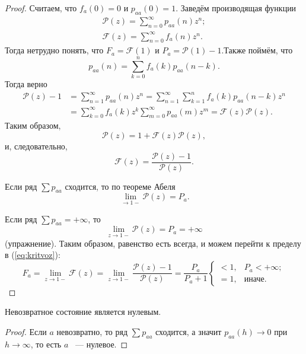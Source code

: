  \begin{proof}
     Считаем, что $f_a(0) = 0 $ и $p_{aa}(0) = 1$. Заведём производящая функции
     \begin{gather*}
         \mathcal{P}(z) = \sum \limits_{n = 0}^{\infty} p_{aa}(n)z^n; \\
     \mathcal{F}(z) =
         \sum \limits_{n = 0}^{\infty} f_a(n)z^n.
     \end{gather*}
     Тогда нетрудно понять, что $F_a = \mathcal{F}(1)$ и $P_a = \mathcal{P}(1) - 1$.Также поймём, что 
     $$p_{aa}(n) = \sum\limits_{k = 0}^{n} f_a(k)p_{aa}(n - k) .$$
    Тогда верно
    \begin{align*}
        \mathcal{P}(z) - 1 &= \sum\limits_{n = 1}^\infty p_{aa}(n)z^n = \sum\limits_{n = 1}^\infty\sum\limits_{k = 1}^n f_a(k)p_{aa}(n - k)z^n \\&=
         \sum\limits_{k = 0}^\infty f_a(k)z^k\sum\limits_{m = 0}^\infty p_{aa}(m)z^m = \mathcal{F}(z)\mathcal{P}(z).
    \end{align*}
     Таким образом,
     $$\mathcal{P}(z) = 1 + \mathcal{F}(z)\mathcal{P}(z),$$
     и, следовательно,
     \begin{equation*}\label{eq:kritvoz}\tag{$*$}
         \mathcal{F}(z) = \frac{\mathcal{P}(z) - 1}{\mathcal{P}(z)}.
     \end{equation*}
   

     Если ряд $\sum p_{aa}$ сходится, то по теореме Абеля
     $$\underset{\to 1-}{\lim} \mathcal{P}(z) =P_a.$$

     Если ряд $\sum p_{aa} = +\infty$, то 
     $$\underset{z\to 1-}{\lim} \mathcal{P}(z) =P_a = +\infty$$
     (упражнение). Таким образом, равенство есть всегда, и можем перейти к пределу в (\ref{eq:kritvoz}):
    $$F_a = \underset{z\to 1-}{\lim} \mathcal{F}(z) = \underset{z\to 1-}{\lim}\frac{\mathcal{P}(z) - 1}{\mathcal{P}(z)} =\frac{P_a}{P_a + 1} \begin{cases}
    < 1, &  P_a < +\infty;\\
    = 1, & \text{иначе}.
    \end{cases}$$

 \end{proof}

 \begin{corollary}
     Невозвратное состояние является нулевым.
 \end{corollary}

 \begin{proof}
     Если $a$ невозвратно, то ряд $\sum p_{aa}$ сходится, а значит
     $p_{aa}(h) \to 0$ при $h\to \infty$, то есть $a$ ~--- нулевое.
 \end{proof}

